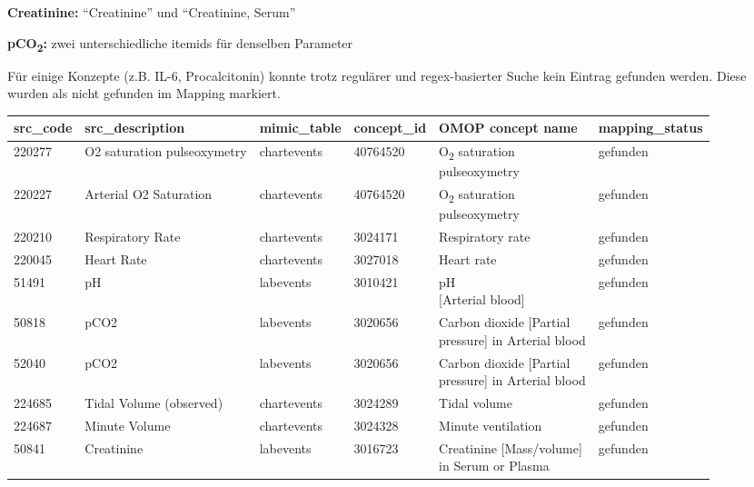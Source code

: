 \documentclass[12pt]{article}
\begin{document}
\textbf{Creatinine:} ``Creatinine'' und ``Creatinine, Serum''

\textbf{pCO\textsubscript{2}:} zwei unterschiedliche itemids für denselben Parameter
\vspace{2mm}

Für einige Konzepte (z.B. IL-6, Procalcitonin) konnte trotz regulärer und regex-basierter Suche kein Eintrag gefunden werden. Diese wurden als nicht gefunden im Mapping markiert.





\begin{table}[H]
\centering
\scriptsize
\renewcommand{\arraystretch}{1.3}
\begin{tabular}{p{1.2cm} p{3cm} p{1.8cm} p{1.6cm} p{4.6cm} p{2cm}}
\toprule
\textbf{src\_code} & \textbf{src\_description} & \textbf{mimic\_table} & \textbf{concept\_id} & \textbf{OMOP concept name} & \textbf{mapping\_status} \\
\midrule
220277 & O2 saturation pulseoxymetry & chartevents & 40764520 & \makecell[l]{O\textsubscript{2} saturation\\ pulseoxymetry} & gefunden \\
220227 & Arterial O2 Saturation & chartevents & 40764520 & \makecell[l]{O\textsubscript{2} saturation\\ pulseoxymetry} & gefunden \\
220210 & Respiratory Rate & chartevents & 3024171 & Respiratory rate & gefunden \\
220045 & Heart Rate & chartevents & 3027018 & Heart rate & gefunden \\
51491 & pH & labevents & 3010421 & \makecell[l]{pH\\ {[}Arterial blood{]}} & gefunden \\
50818  & pCO2 & labevents & 3020656 & \makecell[l]{Carbon dioxide [Partial\\ pressure] in Arterial blood} & gefunden \\
52040  & pCO2 & labevents & 3020656 & \makecell[l]{Carbon dioxide [Partial\\ pressure] in Arterial blood} & gefunden \\
224685 & Tidal Volume (observed) & chartevents & 3024289 & Tidal volume & gefunden \\
224687 & Minute Volume & chartevents & 3024328 & Minute ventilation & gefunden \\
50841  & Creatinine & labevents & 3016723 & \makecell[l]{Creatinine [Mass/volume]\\ in Serum or Plasma} & gefunden \\

\end{tabular}
\end{table}
\end{document}
